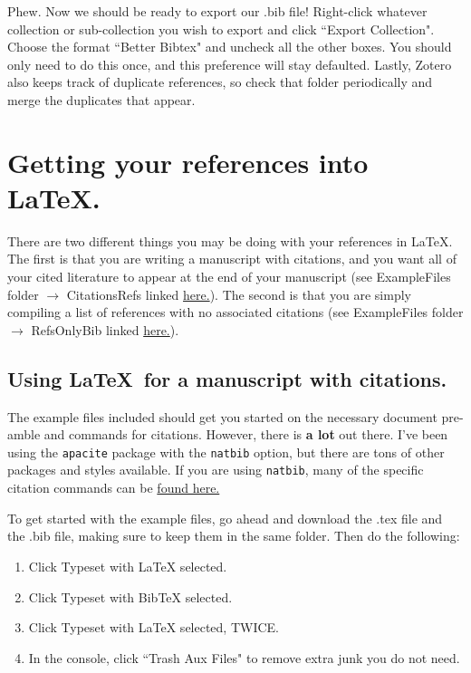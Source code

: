 \documentclass[11pt]{article}
\begin{document}
Phew. Now we should be ready to export our .bib file! Right-click whatever collection or sub-collection you wish to export and click ``Export Collection". Choose the format ``Better Bibtex" and uncheck all the other boxes. You should only need to do this once, and this preference will stay defaulted. Lastly, Zotero also keeps track of duplicate references, so check that folder periodically and merge the duplicates that appear.

\section{Getting your references into \LaTeX.}

There are two different things you may be doing with your references in \LaTeX. The first is that you are writing a manuscript with citations, and you want all of your cited literature to appear at the end of your manuscript (see ExampleFiles folder $\rightarrow$ CitationsRefs linked \href{https://github.com/ledelaney/BibTeXforBrownLab/tree/master/ExampleFiles/CitationsRefs}{here.}). The second is that you are simply compiling a list of references with no associated citations (see ExampleFiles folder $\rightarrow$ RefsOnlyBib linked \href{https://github.com/ledelaney/BibTeXforBrownLab/tree/master/ExampleFiles/RefsOnlyBib}{here.}).

\subsection{Using \LaTeX\ for a manuscript with citations.}
The example files included should get you started on the necessary document pre-amble and commands for citations. However, there is \textbf{a lot} out there. I've been using the \verb|apacite| package with the \verb|natbib| option, but there are tons of other packages and styles available. If you are using \verb|natbib|, many of the specific citation commands can be \href{https://gking.harvard.edu/files/natbib2.pdf}{found here.}

To get started with the example files, go ahead and download the .tex file and the .bib file, making sure to keep them in the same folder. Then do the following:

\begin{enumerate}
\item{Click Typeset with LaTeX selected.}
\item{Click Typeset with BibTeX selected.}
\item{Click Typeset with LaTeX selected, TWICE.}
\item{In the console, click ``Trash Aux Files" to remove extra junk you do not need.}
\end{enumerate}
\end{document}
